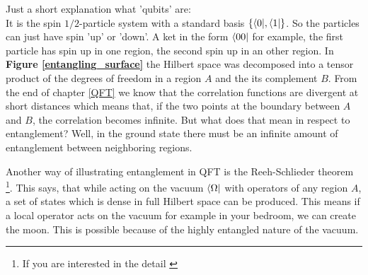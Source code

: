 	Just a short explanation what 'qubits' are: \\
	It is the spin $1/2$-particle system with a standard basis $\{\langle 0 |, \langle 1 |\}$. So the particles can just have spin 'up' or 'down'. A ket in the form $\langle 00 |$ for example, the first particle has spin up in one region, the second spin up in an other region.
	\vspace{0.7cm}
	In \textbf{Figure \ref{entangling_surface}} the Hilbert space was decomposed into a tensor product of the degrees of freedom in a region $A$ and the its complement $B$. From the end of chapter \ref{QFT} we know that the correlation functions are divergent at short distances which means that, if the two points at the boundary between $A$ and $B$, the correlation becomes infinite. But what does that mean in respect to entanglement? Well, in the ground state there must be an infinite amount of entanglement between neighboring regions. 
	
	
	Another way of illustrating entanglement in QFT is the Reeh-Schlieder theorem \footnote{If you are interested in the detail \cite{StreaterWightman}}. This says, that while acting on the vacuum $\langle \Omega |$ with operators of any region $A$, a set of states which is dense in full Hilbert space can be produced. This means if a local operator acts on the vacuum for example in your bedroom, we can create the moon. This is possible because of the highly entangled nature of the vacuum.  
	
